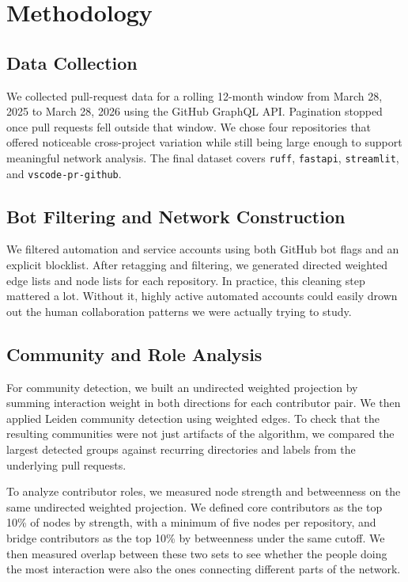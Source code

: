 \documentclass[11pt]{article}
\begin{document}
\section{Methodology}
\subsection{Data Collection}
We collected pull-request data for a rolling 12-month window from March 28, 2025 to March 28, 2026 using the GitHub GraphQL API. Pagination stopped once pull requests fell outside that window. We chose four repositories that offered noticeable cross-project variation while still being large enough to support meaningful network analysis. The final dataset covers \texttt{ruff}, \texttt{fastapi}, \texttt{streamlit}, and \texttt{vscode-pr-github}.

\subsection{Bot Filtering and Network Construction}
We filtered automation and service accounts using both GitHub bot flags and an explicit blocklist. After retagging and filtering, we generated directed weighted edge lists and node lists for each repository. In practice, this cleaning step mattered a lot. Without it, highly active automated accounts could easily drown out the human collaboration patterns we were actually trying to study.

\subsection{Community and Role Analysis}
For community detection, we built an undirected weighted projection by summing interaction weight in both directions for each contributor pair. We then applied Leiden community detection using weighted edges. To check that the resulting communities were not just artifacts of the algorithm, we compared the largest detected groups against recurring directories and labels from the underlying pull requests.

To analyze contributor roles, we measured node strength and betweenness on the same undirected weighted projection. We defined core contributors as the top 10\% of nodes by strength, with a minimum of five nodes per repository, and bridge contributors as the top 10\% by betweenness under the same cutoff. We then measured overlap between these two sets to see whether the people doing the most interaction were also the ones connecting different parts of the network.
\end{document}
